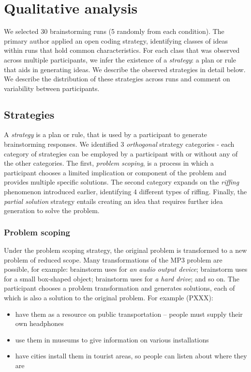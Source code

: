 \section{Qualitative analysis}


We selected 30 brainstorming runs (5 randomly from each condition). The primary author applied an open coding strategy, identifying classes of ideas within runs that hold common characteristics. For each class that was observed across multiple participants, we infer the existence of a \emph{strategy}: a plan or rule that aids in generating ideas. We describe the observed strategies in detail below.
We describe the distribution of these strategies across runs and comment on variability between participants.

\subsection{Strategies}

A \emph{strategy} is a plan or rule, that is used by a participant to generate brainstorming responses.
We identified 3 \emph{orthogonal} strategy categories - each category of strategies can be employed by a participant with or without any of the other categories.
The first, \emph{problem scoping}, is a process in which a participant chooses a limited implication or component of the problem and provides multiple specific solutions.
The second category expands on the \emph{riffing} phenomenon introduced earlier, identifying 4 different types of riffing.
Finally, the \emph{partial solution} strategy entails creating an idea that requires further idea generation to solve the problem.

\subsubsection{Problem scoping}

Under the problem scoping strategy, the original problem is transformed to a new problem of reduced scope.
Many transformations of the MP3 problem are possible, for example: brainstorm uses for \emph{an audio output device}; brainstorm uses for a small box-shaped object; brainstorm uses for \emph{a hard drive}; and so on. The participant chooses a problem transformation and generates solutions, each of which is also a solution to the original problem. For example (PXXX):

\begin{itemize}
    \item have them as a resource on public transportation -- people must supply their own headphones
    \item use them in museums to give information on various installations
    \item have cities install them in tourist areas, so people can listen about where they are
\end{itemize}

